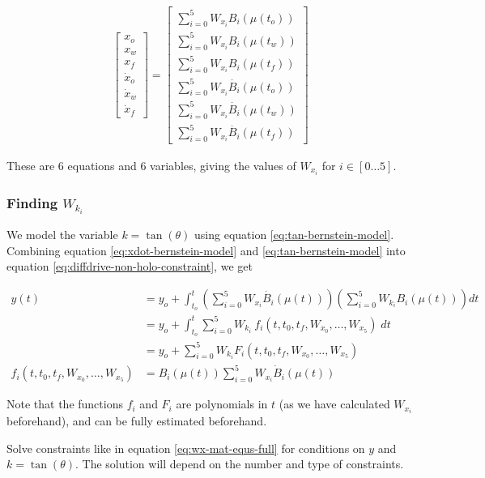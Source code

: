 \begin{align}
    \begin{bmatrix}
        x_o \\ x_w \\ x_f \\ 
        \dot{x}_o \\ \dot{x}_w \\ \dot{x}_f
    \end{bmatrix} = \begin{bmatrix}
        \sum_{i = 0}^{5} W_{x_i} B_i (\mu(t_o)) \\
        \sum_{i = 0}^{5} W_{x_i} B_i (\mu(t_w)) \\
        \sum_{i = 0}^{5} W_{x_i} B_i (\mu(t_f)) \\
        \sum_{i = 0}^{5} W_{x_i} \dot{B_i} (\mu(t_o)) \\
        \sum_{i = 0}^{5} W_{x_i} \dot{B_i} (\mu(t_w)) \\
        \sum_{i = 0}^{5} W_{x_i} \dot{B_i} (\mu(t_f))
    \end{bmatrix}
    \label{eq:wx-mat-equs-full}
\end{align}

These are 6 equations and 6 variables, giving the values of $W_{x_i}$ for $i \in [0\dots 5]$.

\subsubsection{Finding \texorpdfstring{$W_{k_i}$}{weights for k}}

We model the variable $k = \tan(\theta)$ using equation \ref{eq:tan-bernstein-model}. Combining equation \ref{eq:xdot-bernstein-model} and \ref{eq:tan-bernstein-model} into equation \ref{eq:diffdrive-non-holo-constraint}, we get

\begin{align}
    y(t) &= y_o + \int_{t_o}^{t} \left ( \sum_{i = 0}^{5} W_{x_i} \dot{B_i} (\mu(t)) \right ) \left ( \sum_{i = 0}^{5} W_{k_i} B_i (\mu(t)) \right ) dt 
    \nonumber\\
    &= y_o + \int_{t_o}^{t} \sum_{i=0}^{5} W_{k_i} \: f_i (t, t_0, t_f, W_{x_0}, \dots, W_{x_5}) \; dt
    \nonumber \\
    &= y_o + \sum_{i=0}^{5} W_{k_i} F_i (t, t_0, t_f, W_{x_0}, \dots, W_{x_5})
    \label{eq:t-mix-bernstein-model} \\
    f_i (t, t_0, t_f, W_{x_0}, \dots, W_{x_5}) &= B_i(\mu(t)) \sum_{i=0}^{5} W_{x_i} \dot{B}_i (\mu(t)) \nonumber
\end{align}

Note that the functions $f_i$ and $F_i$ are polynomials in $t$ (as we have calculated $W_{x_i}$ beforehand), and can be fully estimated beforehand.

Solve constraints like in equation \ref{eq:wx-mat-equs-full} for conditions on $y$ and $k = \tan(\theta)$. The solution will depend on the number and type of constraints.

